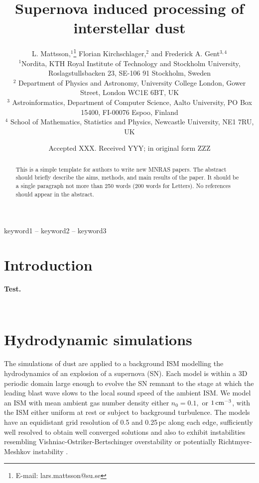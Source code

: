 \documentclass[fleqn,usenatbib]{mnras}
\title[Supernova induced processing of interstellar dust]{Supernova induced processing of interstellar dust}
\author[L. Mattsson et al.]{
L. Mattsson,$^{1}$\thanks{E-mail: lars.mattsson@su.se}
Florian Kirchschlager,$^{2}$ and
Frederick A. Gent$^{3,4}$
\\
$^{1}$Nordita, KTH Royal Institute of Technology and Stockholm University, Roslagstullsbacken 23, SE-106 91 Stockholm, Sweden\\
$^{2}$
Department
of Physics and Astronomy, University College London, Gower Street, London WC1E 6BT, UK\\
$^{3}$
Astroinformatics, Department of Computer Science, Aalto University, PO Box 15400, FI-00076 Espoo, Finland\\
$^{4}$
    School of Mathematics, Statistics and Physics,
      Newcastle University, NE1 7RU, UK 
}
\date{Accepted XXX. Received YYY; in original form ZZZ}
\newcommand{\fk}[1]{{\bf \textcolor{PineGreen}{#1}}}		%
\def\cmcube{{\,{\rm cm}^{-3}}}
\begin{document}
\label{firstpage}
\pagerange{\pageref{firstpage}--\pageref{lastpage}}
\maketitle

\begin{abstract}
This is a simple template for authors to write new MNRAS papers.
The abstract should briefly describe the aims, methods, and main results of the paper.
It should be a single paragraph not more than 250 words (200 words for Letters).
No references should appear in the abstract.
\end{abstract}

\begin{keywords}
keyword1 -- keyword2 -- keyword3
\end{keywords}



\section{Introduction}
\fk{Test.}

\newpage~
\newpage
 
\section{Hydrodynamic simulations}\label{sect:HD}


  The simulations of dust are applied to a background ISM modelling the 
  hydrodynamics of an explosion of a supernova (SN). 
  Each model is within a 3D periodic domain large enough to evolve the SN
  remnant to the stage at which the leading blast wave slows to the local
  sound speed of the ambient ISM.
  We model an ISM with mean ambient gas number density either $n_0=0.1,$ or
  $1\cmcube$, with the ISM either uniform at rest or subject to background
  turbulence.
  The models have an equidistant grid resolution of 0.5 and 0.25\,pc along each
  edge, sufficiently well resolved to obtain well converged solutions 
  \citep{GMKSH20,GMKS21} and also to exhibit instabilities resembling 
  Vishniac-Ostriker-Bertschinger overstability \citep{Vishniac83,VOB85} or
  potentially Richtmyer-Meshkov instability \citep{Bro02}.
\end{document}

